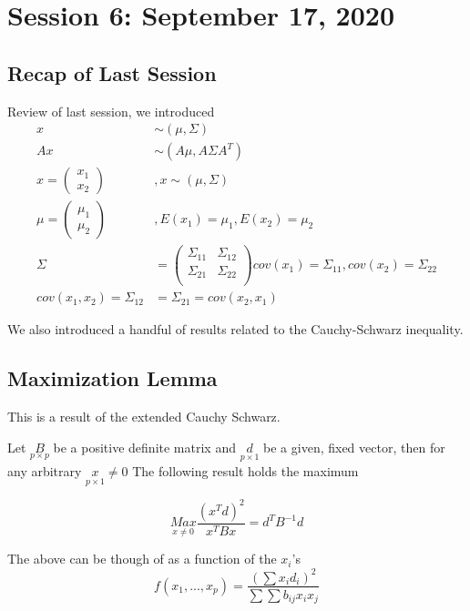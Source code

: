 \chapter{Session 6: September 17, 2020}
\label{sixth}
\section{Recap of Last Session}
Review of last session, we introduced 
\begin{align*}
    x &\sim (\mu,\Sigma)\\
    Ax &\sim (A\mu,A\Sigma A^T) \\
    x = 
    \begin{pmatrix}
    x_1\\
    x_2
    \end{pmatrix}&,
    x \sim (\mu, \Sigma) \\
    \mu = 
    \begin{pmatrix}
    \mu_1\\
    \mu_2
    \end{pmatrix}
    &,
    E(x_1) = \mu_1, E(x_2) = \mu_2\\
    \Sigma &= \begin{pmatrix}
    \Sigma_{11} & \Sigma_{12} \\
    \Sigma_{21} & \Sigma_{22} \\
    \end{pmatrix}
    cov(x_1) = \Sigma_{11}, cov(x_2) = \Sigma_{22}\\
    cov(x_1,x_2)=\Sigma_{12} &= \Sigma_{21} = cov(x_2,x_1)
\end{align*}

We also introduced a handful of results related to the Cauchy-Schwarz inequality.

\section{Maximization Lemma}
This is a result of the extended Cauchy Schwarz.

Let $\underset{p \times p}{B}$ be a positive definite matrix and $\underset{p \times 1}{d}$ be a given, fixed vector, then for any arbitrary $\underset{p \times 1}{x}\neq 0$ The following result holds the maximum

\[\underset{x\neq 0}{Max} \frac{(x^Td)^2}{x^TBx} = d^TB^{-1}d\]

The above can be though of as a function of the $x_i$'s
\[f(x_1,...,x_p) = \frac{(\sum x_id_i)^2}{\sum\sum b_{ij}x_i x_j}\]

